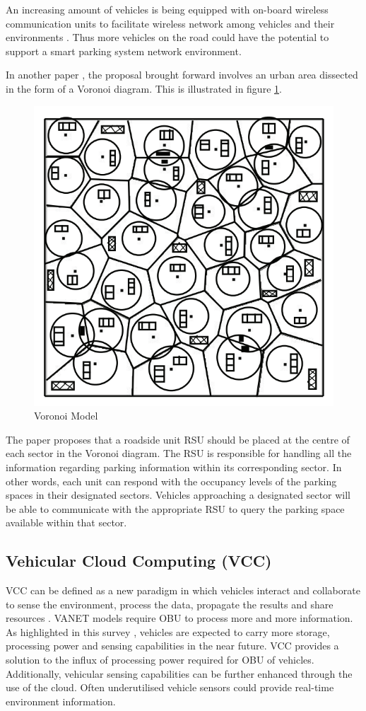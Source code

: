 An increasing amount of vehicles is being equipped with on-board wireless communication units to facilitate wireless network among vehicles and their environments \citep{Lin2008SecurityNetworks}. Thus more vehicles on the road could have the potential to support a smart parking system network environment.

In another paper \citep{Panayappan2007VANET-basedAvailability}, the proposal brought forward involves an urban area dissected in the form of a Voronoi diagram. This is illustrated in figure \ref{figure:voronoi}.

\begin{figure}[H]
    \centering
    \includegraphics[width=0.40\linewidth]{./Images/VORONOI.png}
    \caption{Voronoi Model}
    \label{figure:voronoi}
\end{figure}

The paper proposes that a roadside unit \ac{RSU} should be placed at the centre of each sector in the Voronoi diagram. The \ac{RSU} is responsible for handling all the information regarding parking information within its corresponding sector. In other words, each unit can respond with the occupancy levels of the parking spaces in their designated sectors. Vehicles approaching a designated sector will be able to communicate with the appropriate \ac{RSU} to query the parking space available within that sector.

\subsection{Vehicular Cloud Computing (VCC)}
\ac{VCC} can be defined as a new paradigm in which vehicles interact and collaborate to sense the environment, process the data, propagate the results and share resources \citep{Mehmood2017Cyber-PhysicalCommunications}. \ac{VANET} models require \ac{OBU} to process more and more information. As highlighted in this survey \citep{Whaiduzzaman2014AComputing}, vehicles are expected to carry more storage, processing power and sensing capabilities in the near future. \ac{VCC} provides a solution to the influx of processing power required for \ac{OBU} of vehicles. Additionally, vehicular sensing capabilities can be further enhanced through the use of the cloud. Often underutilised vehicle sensors could provide real-time environment information.

